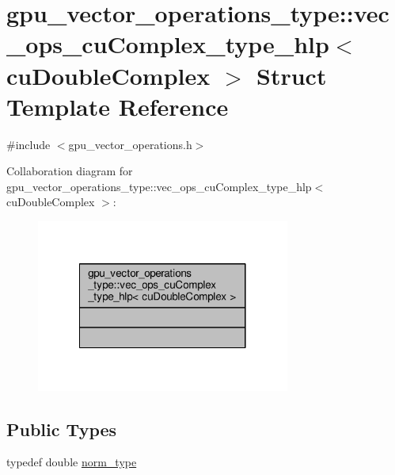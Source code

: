 \hypertarget{structgpu__vector__operations__type_1_1vec__ops__cuComplex__type__hlp_3_01cuDoubleComplex_01_4}{\section{gpu\-\_\-vector\-\_\-operations\-\_\-type\-:\-:vec\-\_\-ops\-\_\-cu\-Complex\-\_\-type\-\_\-hlp$<$ cu\-Double\-Complex $>$ Struct Template Reference}
\label{structgpu__vector__operations__type_1_1vec__ops__cuComplex__type__hlp_3_01cuDoubleComplex_01_4}
}


{\ttfamily \#include $<$gpu\-\_\-vector\-\_\-operations.\-h$>$}



Collaboration diagram for gpu\-\_\-vector\-\_\-operations\-\_\-type\-:\-:vec\-\_\-ops\-\_\-cu\-Complex\-\_\-type\-\_\-hlp$<$ cu\-Double\-Complex $>$\-:\nopagebreak
\begin{figure}[H]
\begin{center}
\leavevmode
\includegraphics[width=236pt]{structgpu__vector__operations__type_1_1vec__ops__cuComplex__type__hlp_3_01cuDoubleComplex_01_4__coll__graph}
\end{center}
\end{figure}
\subsection*{Public Types}
\begin{DoxyCompactItemize}
\item 
typedef double \hyperlink{structgpu__vector__operations__type_1_1vec__ops__cuComplex__type__hlp_3_01cuDoubleComplex_01_4_a4d17e695719bc675d33dc12fced06c66}{norm\-\_\-type}
\end{DoxyCompactItemize}


